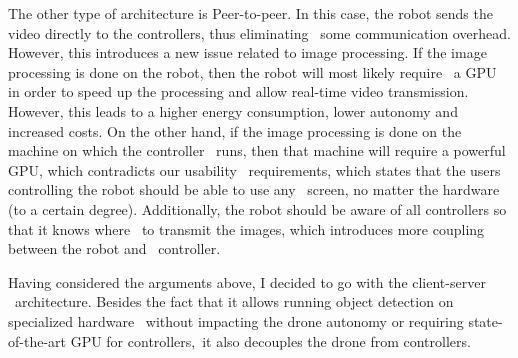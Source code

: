 The other type of architecture is Peer-to-peer.
In this case, the robot sends the video directly to the controllers, thus eliminating \
some communication overhead.
However, this introduces a new issue related to image processing.
If the image processing is done on the robot, then the robot will most likely require \
a GPU in order to speed up the processing and allow real-time video transmission.
However, this leads to a higher energy consumption, lower autonomy and increased costs.
On the other hand, if the image processing is done on the machine on which the controller \
runs, then that machine will require a powerful GPU, which contradicts our usability \
requirements, which states that the users controlling the robot should be able to use any \
screen, no matter the hardware (to a certain degree).
Additionally, the robot should be aware of all controllers so that it knows where \
to transmit the images, which introduces more coupling between the robot and \
controller.

Having considered the arguments above, I decided to go with the client-server \
architecture.
Besides the fact that it allows running object detection on specialized hardware \
without impacting the drone autonomy or requiring state-of-the-art GPU for controllers,\
it also decouples the drone from controllers.

